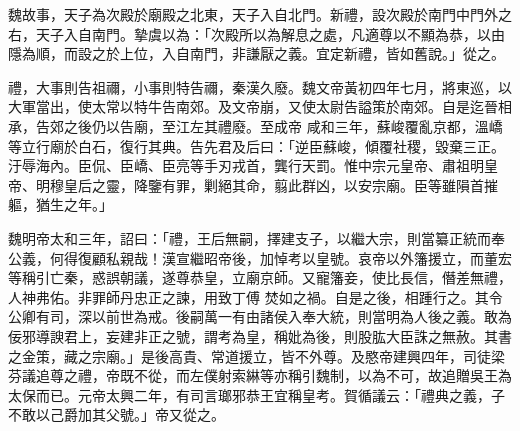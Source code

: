 \begin{pinyinscope}
 魏故事，天子為次殿於廟殿之北東，天子入自北門。新禮，設次殿於南門中門外之右，天子入自南門。摯虞以為：「次殿所以為解息之處，凡適尊以不顯為恭，以由隱為順，而設之於上位，入自南門，非謙厭之義。宜定新禮，皆如舊說。」從之。



 禮，大事則告祖禰，小事則特告禰，秦漢久廢。魏文帝黃初四年七月，將東巡，以大軍當出，使太常以特牛告南郊。及文帝崩，又使太尉告謚策於南郊。自是迄晉相承，告郊之後仍以告廟，至江左其禮廢。至成帝
 咸和三年，蘇峻覆亂京都，溫嶠等立行廟於白石，復行其典。告先君及后曰：「逆臣蘇峻，傾覆社稷，毀棄三正。汙辱海內。臣侃、臣嶠、臣亮等手刃戎首，龔行天罰。惟中宗元皇帝、肅祖明皇帝、明穆皇后之靈，降鑒有罪，剿絕其命，翦此群凶，以安宗廟。臣等雖隕首摧軀，猶生之年。」



 魏明帝太和三年，詔曰：「禮，王后無嗣，擇建支子，以繼大宗，則當纂正統而奉公義，何得復顧私親哉！漢宣繼昭帝後，加悼考以皇號。哀帝以外籓援立，而董宏等稱引亡秦，惑誤朝議，遂尊恭皇，立廟京師。又寵籓妾，使比長信，僭差無禮，人神弗佑。非罪師丹忠正之諫，用致丁傅
 焚如之禍。自是之後，相踵行之。其令公卿有司，深以前世為戒。後嗣萬一有由諸侯入奉大統，則當明為人後之義。敢為佞邪導諛君上，妄建非正之號，謂考為皇，稱妣為後，則股肱大臣誅之無赦。其書之金策，藏之宗廟。」是後高貴、常道援立，皆不外尊。及愍帝建興四年，司徒梁芬議追尊之禮，帝既不從，而左僕射索綝等亦稱引魏制，以為不可，故追贈吳王為太保而已。元帝太興二年，有司言瑯邪恭王宜稱皇考。賀循議云：「禮典之義，子不敢以己爵加其父號。」帝又從之。



\end{pinyinscope}